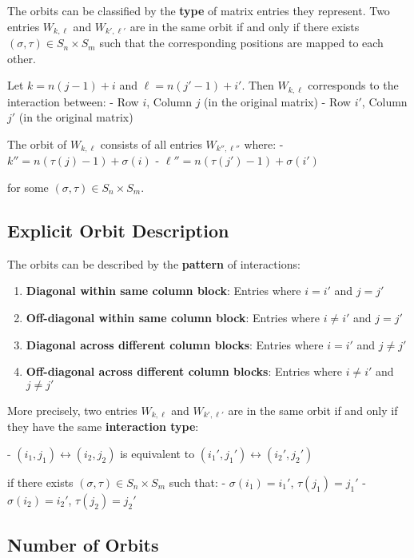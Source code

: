 \documentclass[11pt]{article}
\begin{document}
The orbits can be classified by the \textbf{type} of matrix entries they represent. Two entries $W_{k,\ell}$ and $W_{k',\ell'}$ are in the same orbit if and only if there exists $(\sigma, \tau) \in S_n \times S_m$ such that the corresponding positions are mapped to each other.

Let $k = n(j-1) + i$ and $\ell = n(j'-1) + i'$. Then $W_{k,\ell}$ corresponds to the interaction between:
- Row $i$, Column $j$ (in the original matrix)
- Row $i'$, Column $j'$ (in the original matrix)

The orbit of $W_{k,\ell}$ consists of all entries $W_{k'',\ell''}$ where:
- $k'' = n(\tau(j)-1) + \sigma(i)$
- $\ell'' = n(\tau(j')-1) + \sigma(i')$

for some $(\sigma, \tau) \in S_n \times S_m$.

\subsection{Explicit Orbit Description}

The orbits can be described by the \textbf{pattern} of interactions:

\begin{enumerate}
    \item \textbf{Diagonal within same column block}: Entries where $i = i'$ and $j = j'$
    \item \textbf{Off-diagonal within same column block}: Entries where $i \neq i'$ and $j = j'$
    \item \textbf{Diagonal across different column blocks}: Entries where $i = i'$ and $j \neq j'$
    \item \textbf{Off-diagonal across different column blocks}: Entries where $i \neq i'$ and $j \neq j'$
\end{enumerate}

More precisely, two entries $W_{k,\ell}$ and $W_{k',\ell'}$ are in the same orbit if and only if they have the same \textbf{interaction type}:

- $(i_1, j_1) \leftrightarrow (i_2, j_2)$ is equivalent to $(i_1', j_1') \leftrightarrow (i_2', j_2')$

if there exists $(\sigma, \tau) \in S_n \times S_m$ such that:
- $\sigma(i_1) = i_1'$, $\tau(j_1) = j_1'$
- $\sigma(i_2) = i_2'$, $\tau(j_2) = j_2'$

\subsection{Number of Orbits}
\end{document}

